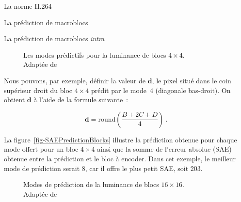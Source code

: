 \begin{chapter}{La norme H.264}
\begin{section}{La prédiction de macroblocs}
\begin{subsection}{La prédiction de macroblocs \textit{intra}}
\begin{figure}
\centering {}
\caption[Les modes prédictifs pour la luminance de blocs $4 \times 4$]{Les modes
prédictifs pour la luminance de blocs $4 \times 4$. \\Adaptée de
\citet[p.~179]{richardson2003}}
\label{fig-4x4PredictionModes}
\end{figure}

Nous pouvons, par exemple, définir la valeur de $\mathbf{d}$, le pixel situé
dans le coin supérieur droit du bloc $4 \times 4$ prédit par le mode~4
(diagonale bas-droit). On obtient $\mathbf{d}$ à l'aide de la formule
suivante~:

\begin{equation}
\mathbf{d} = \text{round} \left(\frac{B + 2C + D}{4} \right)\:.
\end{equation}

La figure~\ref{fig-SAEPredictionBlocks} illustre la prédiction obtenue pour
chaque mode offert pour un bloc $4 \times 4$ ainsi que la somme de l'erreur
absolue (SAE) obtenue entre la prédiction et le bloc à encoder. Dans cet
exemple, le meilleur mode de prédiction serait 8, car il offre le plus petit
SAE, soit 203.

\begin{figure}
\centering {}
\caption[Modes de prédiction de la luminance de blocs $16 \times 16$]{Modes de
prédiction de la luminance de blocs $16 \times 16$. \\Adaptée de
\citet[p.~181]{richardson2003}}
\label{fig-16x16PredictionModes}
\end{figure}


\end{subsection}
\end{section}
\end{chapter}
